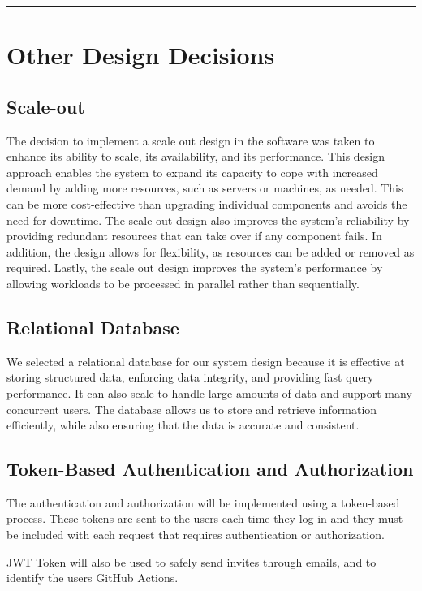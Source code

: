 \documentclass{Configuration_Files/Template}
\begin{document}
{\color{bluepoli}\rule{\linewidth}{0.1pt}}

\section{Other Design Decisions}

\subsection{Scale-out} 

The decision to implement a scale out design in the software was taken to enhance its ability to scale, its availability, and its performance. This design approach enables the system to expand its capacity to cope with increased demand by adding more resources, such as servers or machines, as needed. This can be more cost-effective than upgrading individual components and avoids the need for downtime. The scale out design also improves the system’s reliability by providing redundant resources that can take over if
any component fails. In addition, the design allows for flexibility, as resources can be added or removed as required. Lastly, the scale out design improves the system’s performance by allowing workloads to be processed in parallel rather than sequentially.

\subsection{Relational Database}

We selected a relational database for our system design because it is effective at storing structured data, enforcing data integrity, and providing fast query performance. It can also scale to handle large amounts of data and support many concurrent users. The database allows us to store and retrieve information efficiently, while also ensuring that the data is accurate and consistent.

\subsection{Token-Based Authentication and Authorization}

The authentication and authorization will be implemented using a token-based process. These tokens are sent to the users each time they log in and they must be included with each request that requires authentication or authorization.

JWT Token will also be used to safely send invites through emails, and to identify the users GitHub Actions.
\end{document}
